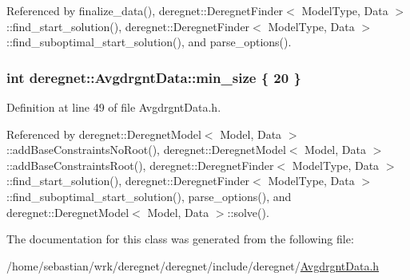 Referenced by finalize\+\_\+data(), deregnet\+::\+Deregnet\+Finder$<$ Model\+Type, Data $>$\+::find\+\_\+start\+\_\+solution(), deregnet\+::\+Deregnet\+Finder$<$ Model\+Type, Data $>$\+::find\+\_\+suboptimal\+\_\+start\+\_\+solution(), and parse\+\_\+options().

\subsubsection[{\texorpdfstring{min\+\_\+size}{min_size}}]{\setlength{\rightskip}{0pt plus 5cm}int deregnet\+::\+Avgdrgnt\+Data\+::min\+\_\+size \{ 20 \}}\hypertarget{classderegnet_1_1AvgdrgntData_a733e0cd627433fca043a7f9b70af18c3}{}\label{classderegnet_1_1AvgdrgntData_a733e0cd627433fca043a7f9b70af18c3}


Definition at line 49 of file Avgdrgnt\+Data.\+h.



Referenced by deregnet\+::\+Deregnet\+Model$<$ Model, Data $>$\+::add\+Base\+Constraints\+No\+Root(), deregnet\+::\+Deregnet\+Model$<$ Model, Data $>$\+::add\+Base\+Constraints\+Root(), deregnet\+::\+Deregnet\+Finder$<$ Model\+Type, Data $>$\+::find\+\_\+start\+\_\+solution(), deregnet\+::\+Deregnet\+Finder$<$ Model\+Type, Data $>$\+::find\+\_\+suboptimal\+\_\+start\+\_\+solution(), parse\+\_\+options(), and deregnet\+::\+Deregnet\+Model$<$ Model, Data $>$\+::solve().



The documentation for this class was generated from the following file\+:\begin{DoxyCompactItemize}
\item 
/home/sebastian/wrk/deregnet/deregnet/include/deregnet/\hyperlink{AvgdrgntData_8h}{Avgdrgnt\+Data.\+h}\end{DoxyCompactItemize}
